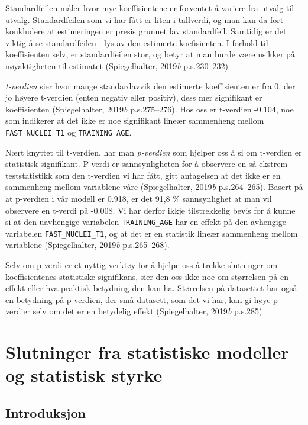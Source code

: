 \documentclass[
  letterpaper,
  DIV=11,
  numbers=noendperiod]{scrreprt}
\begin{document}
Standardfeilen måler hvor mye koeffisientene er forventet å variere fra
utvalg til utvalg. Standardfeilen som vi har fått er liten i tallverdi,
og man kan da fort konkludere at estimeringen er presis grunnet lav
standardfeil. Samtidig er det viktig å se standardfeilen i lys av den
estimerte koefisienten. I forhold til koeffisienten selv, er
standardfeilen stor, og betyr at man burde være usikker på nøyaktigheten
til estimatet (Spiegelhalter, 2019\emph{b} p.s.230--232)

\emph{t-verdien} sier hvor mange standardavvik den estimerte
koeffisienten er fra 0, der jo høyere t-verdien (enten negativ eller
positiv), dess mer signifikant er koeffisienten (Spiegelhalter,
2019\emph{b} p.s.275--276). Hos oss er t-verdien -0.104, noe som
indikerer at det ikke er noe signifikant lineær sammenheng mellom
\texttt{FAST\_NUCLEI\_T1} og \texttt{TRAINING\_AGE}.

Nært knyttet til t-verdien, har man \emph{p-verdien} som hjelper oss å
si om t-verdien er statistisk signifikant. P-verdi er sannsynligheten
for å observere en så ekstrem teststatistikk som den t-verdien vi har
fått, gitt antagelsen at det ikke er en sammenheng mellom variablene
våre (Spiegelhalter, 2019\emph{b} p.s.264--265). Basert på at p-verdien
i vår modell er 0.918, er det 91,8 \% sannsynlighet at man vil observere
en t-verdi på -0.008. Vi har derfor ikkje tilstrekkelig bevis for å
kunne si at den uavhengige variabelen \texttt{TRAINING\_AGE} har en
effekt på den avhengige variabelen \texttt{FAST\_NUCLEI\_T1}, og at det
er en statistik lineær sammenheng mellom variablene (Spiegelhalter,
2019\emph{b} p.s.265--268).

Selv om p-verdi er et nyttig verktøy for å hjelpe oss å trekke
slutninger om koeffisientenes statistiske signifikans, sier den oss ikke
noe om størrelsen på en effekt eller hva praktisk betydning den kan ha.
Størrelsen på datasettet har også en betydning på p-verdien, der små
datasett, som det vi har, kan gi høye p-verdier selv om det er en
betydelig effekt (Spiegelhalter, 2019\emph{b} p.s.285)


\chapter{Slutninger fra statistiske modeller og statistisk
styrke}\label{slutninger-fra-statistiske-modeller-og-statistisk-styrke}

\section{Introduksjon}\label{introduksjon-4}
\end{document}
